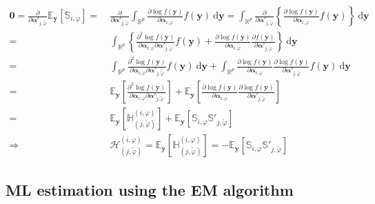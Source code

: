\documentclass[11pt, a4paper]{article}
\newcommand{\R}{{\ensuremath{\mathbb{R}}}}
\begin{document}
\begin{align*}
\bm{0} = \frac{\partial}{\partial \bm{\alpha}'_{j,\tilde{\varphi}}} \mathbb{E}_{\mathbf{y}}\left[\mathbb{S}_{i,\varphi}\right] = & ~ \frac{\partial }{\partial \bm{\alpha}'_{j,\tilde{\varphi}}} \int_{\R^p} \frac{\partial \log f(\mathbf{y})}{\partial \bm{\alpha}_{i,\varphi}} f(\mathbf{y}) ~\text{d}\mathbf{y} = \int_{\R^p} \frac{\partial}{\partial \bm{\alpha}'_{j,\tilde{\varphi}}} \left\{ \frac{\partial \log f(\mathbf{y})}{\partial \bm{\alpha}_{i,\varphi}} f(\mathbf{y}) \right\} ~\text{d}\mathbf{y} \\[3mm]
= & ~ \int_{\R^p} \left\{ \frac{\partial^2 \log f(\mathbf{y})}{\partial \bm{\alpha}_{i,\varphi} \partial \bm{\alpha}'_{j,\tilde{\varphi}}} f(\mathbf{y}) + \frac{\partial \log f(\mathbf{y})}{\partial \bm{\alpha}_{i,\varphi}} \frac{\partial f(\mathbf{y})}{\partial \bm{\alpha}'_{j,\tilde{\varphi}}} \right\} ~\text{d}\mathbf{y} \\[3mm]
= & ~ \int_{\R^p} \frac{\partial^2 \log f(\mathbf{y})}{\partial \bm{\alpha}_{i,\varphi} \partial \bm{\alpha}'_{j,\tilde{\varphi}}} f(\mathbf{y}) ~\text{d}\mathbf{y} + \int_{\R^p} \frac{\partial \log f(\mathbf{y})}{\partial \bm{\alpha}_{i,\varphi}} \frac{\partial \log f(\mathbf{y})}{\partial \bm{\alpha}'_{j,\tilde{\varphi}}} f(\mathbf{y}) ~\text{d}\mathbf{y} \\[3mm]
= & ~ \mathbb{E}_{\mathbf{y}}\left[\frac{\partial^2 \log f(\mathbf{y})}{\partial \bm{\alpha}_{i,\varphi} \partial \bm{\alpha}'_{j,\tilde{\varphi}}} \right] +  \mathbb{E}_{\mathbf{y}}\left[\frac{\partial \log f(\mathbf{y})}{\partial \bm{\alpha}_{i,\varphi}} \frac{\partial \log f(\mathbf{y})}{\partial \bm{\alpha}'_{j,\tilde{\varphi}}} \right] \\[3mm]
= & ~ \mathbb{E}_{\mathbf{y}}\left[\mathbb{H}^{(i,\varphi)}_{(j,\tilde{\varphi})}\right] + \mathbb{E}_{\mathbf{y}}\left[\mathbb{S}_{i,\varphi} \mathbb{S}'_{j,\tilde{\varphi}}\right] \\[3mm]
\Longrightarrow & ~ \mathcal{H}^{(i,\varphi)}_{(j,\tilde{\varphi})} = \mathbb{E}_{\mathbf{y}}\left[\mathbb{H}^{(i,\varphi)}_{(j,\tilde{\varphi})}\right] = - \mathbb{E}_{\mathbf{y}}\left[\mathbb{S}_{i,\varphi} \mathbb{S}'_{j,\tilde{\varphi}}\right]
\end{align*}

\subsection{ML estimation using the EM algorithm}
\end{document}
